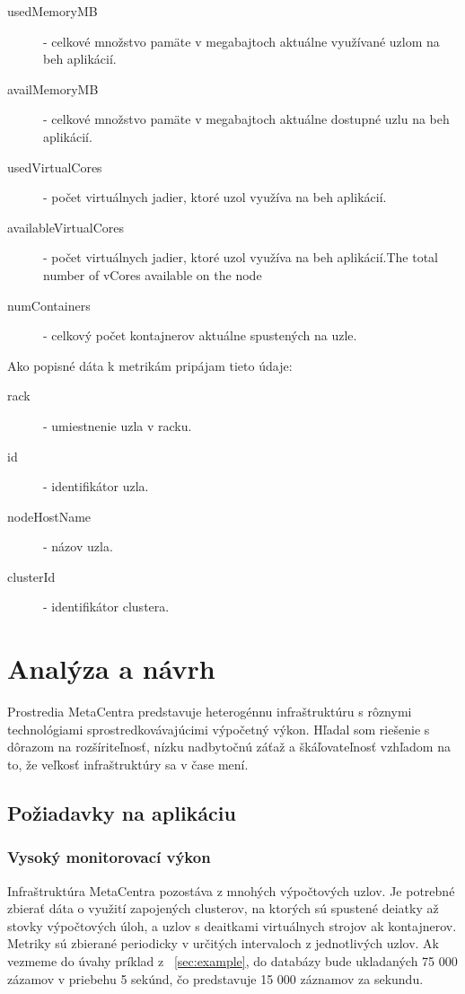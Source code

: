 \documentclass[12pt,twoside,color,cover,table]{fithesis3}
\begin{document}
\begin{description}
\item[usedMemoryMB] - celkové množstvo pamäte v megabajtoch aktuálne využívané uzlom na beh aplikácií.
\item[availMemoryMB] - celkové množstvo pamäte v megabajtoch aktuálne dostupné uzlu na beh aplikácií.
\item[usedVirtualCores] - počet virtuálnych jadier, ktoré uzol využíva na beh aplikácií.
\item[availableVirtualCores] - počet virtuálnych jadier, ktoré uzol využíva na beh aplikácií.The total number of vCores available on the node
\item[numContainers] - celkový počet kontajnerov aktuálne spustených na uzle.
\end{description}

Ako popisné dáta k metrikám pripájam tieto údaje:
\begin{description}
\item[rack] - umiestnenie uzla v racku.
\item[id] - identifikátor uzla.
\item[nodeHostName] - názov uzla.
\item[clusterId] - identifikátor clustera.
\end{description}

\chapter{Analýza a návrh}
Prostredia MetaCentra predstavuje heterogénnu infraštruktúru s rôznymi technológiami sprostredkovávajúcimi výpočetný výkon. Hľadal som riešenie s dôrazom na rozšíriteľnosť, 
nízku nadbytočnú záťaž a škáľovateľnosť vzhľadom na to, že veľkosť infraštruktúry sa v čase mení.

\section{Požiadavky na aplikáciu}
\subsection{Vysoký monitorovací výkon}
Infraštruktúra MetaCentra pozostáva z mnohých výpočtových uzlov. Je potrebné zbierať dáta o využití zapojených
clusterov, na ktorých sú spustené deiatky až stovky výpočtových úloh, a uzlov s deaitkami virtuálnych strojov ak kontajnerov. Metriky sú zbierané periodicky v určitých intervaloch z jednotlivých uzlov. 
Ak vezmeme do úvahy príklad z ~\ref{sec:example}, do databázy bude ukladaných 75 000 zázamov v priebehu 5 sekúnd, čo predstavuje 15 000 záznamov za sekundu. 
\end{document}
